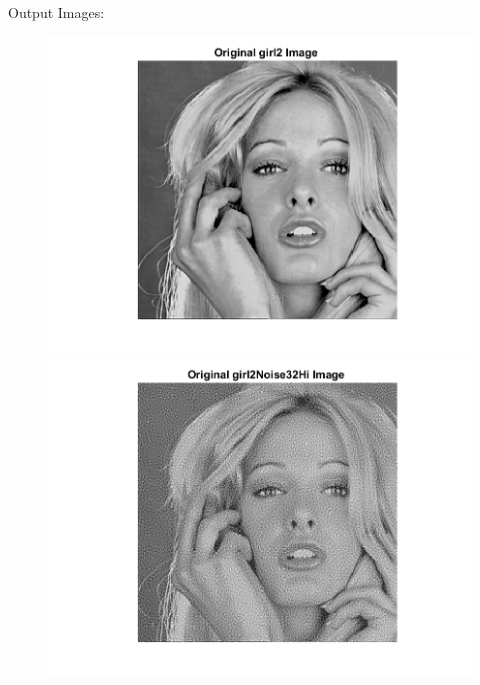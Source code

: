\documentclass[11pt]{article} %
\begin{document}
Output Images: 
\begin{figure}
 \centering
	\includegraphics{2da.png}
	\includegraphics{2db.png}
\end{figure}
\end{document}
